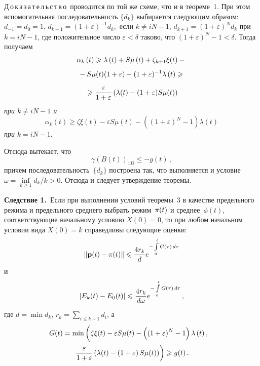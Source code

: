 \begin{multicols}{2}
\medskip

\noindent
Д\,о\,к\,а\,з\,а\,т\,е\,л\,ь\,с\,т\,в\,о\ проводится по той же схеме, что и в теореме~1.
При этом вспомогательная  последовательность $\{d_k\}$ выбирается следующим образом:
$d_{-1}=d_0=1$, $d_{k+1}=(1+\varepsilon)^{-1}d_k,$ если $k \neq iN-1$, $d_{k+1}=(1+\varepsilon)^N d_k$
при $k = iN-1$, где положительное число $\varepsilon < \delta$ таково, что $(1+\varepsilon)^N - 1 < \delta$.
Тогда получаем
\begin{multline*}
\alpha_{k}\left( t\right) \ge \lambda\left(t\right) + S\mu \left( t\right) + \zeta_{k+1} \xi(t) -{}\\[4pt]
{}- S\mu(t)(1+\varepsilon) - (1+\varepsilon)^{-1}
\lambda\left(t\right) \ge {}\\[4pt]
{}\ge \fr{\varepsilon}{1+\varepsilon}\left(\lambda (t)  - (1+\varepsilon)S\mu(t)\right)
\end{multline*}
\textit{при  $k \neq iN-1$ и}
\begin{equation*}
\alpha_{k}\left( t\right) \ge  \zeta \xi(t) - \varepsilon S\mu(t) - \left((1+\varepsilon)^{N} -1\right)
\lambda\left(t\right)
\end{equation*}
\textit{при}  $k = iN-1$.

Отсюда вытекает, что
\begin{equation*}
\gamma \left(B(t)\right)_{1D} \le - g(t)\,,
\end{equation*}
причем последовательность~$\{d_k\}$ построена так, что выполняется и условие
$\omega = \inf\limits_{k \ge 1} d_k/k > 0$. Отсюда и следует утверждение теоремы.
\bigskip

\noindent
\textbf{Следствие 1.}\
Если при выполнении условий теоремы~3 в качестве предельного режима и предельного среднего выбрать режим~${\bf \pi}(t)$
и среднее~$\phi(t)$, соответствующие начальному условию $X(0) = 0$, то  при любом начальном условии вида
$X(0) = k$ справедливы следующие оценки:
\begin{equation*}
\|{\bf p}(t) - {\bf \pi}(t)\| \le \frac{4r_k}{d} e^{-\int\limits_0^t
G(\tau)\, d\tau} \label{zkts21}
\end{equation*}
и
\begin{equation*}
\left|E_k(t) - E_0(t)\right| \le \fr{4r_k}{d \omega} e^{-\int\limits_0^t
G(\tau)\, d\tau}\,,
\end{equation*}
где $ d = \min d_k$, $r_k = \sum_{i \le k-1} d_i$, а
\begin{multline*}
\!\!\!\!G(t) =  \min \left(
\vphantom{\fr{\varepsilon}{1+\varepsilon}}
\zeta \xi(t) - \varepsilon S\mu(t) - \left(
\left(1+\varepsilon\right)^{N} -1\right)\lambda\left(t\right),\right.\\
\left.\fr{\varepsilon}{1+\varepsilon}\left(\lambda (t)  - \left(1+\varepsilon\right)
S\mu(t)\right)\right) \ge g(t)\,.
\end{multline*}


\end{multicols}
